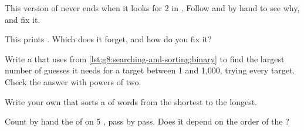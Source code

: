\begin{exercise}[$\star\star$]\label{exo:g8:searching-and-sorting:5}
This version of  never ends when it looks for 2 in
\code{[4, 9]}. Follow  and  by hand to see why, and fix
it.

\label{lst:g8:searching-and-sorting:binary-bug}
\end{exercise}

\begin{exercise}[$\star\star$]\label{exo:g8:searching-and-sorting:6}
This  prints \code{[5, 1, 3]}. Which  does it forget, and
how do you fix it?

\label{lst:g8:searching-and-sorting:insertion-bug}
\end{exercise}

\begin{exercise}[$\star\star$]\label{exo:g8:searching-and-sorting:7}
Write a  that uses  from
\cref{lst:g8:searching-and-sorting:binary} to find the largest number of
guesses it needs for a target between 1 and 1,000, trying every target.
Check the answer with powers of two.
\end{exercise}

\begin{exercise}[$\star\star$]\label{exo:g8:searching-and-sorting:8}
Write your own  that sorts a  of words from the shortest to
the longest.
\end{exercise}

\begin{exercise}[$\star\star$]\label{exo:g8:searching-and-sorting:9}
Count by hand the  of  on 5 , pass by pass.
Does it depend on the order of the ?
\end{exercise}

